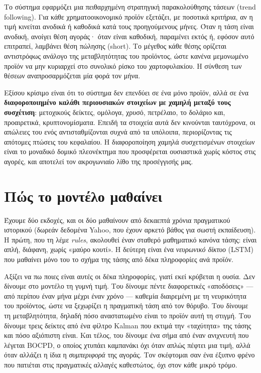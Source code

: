 \documentclass[11pt]{article}
\begin{document}
Το σύστημα εφαρμόζει μια πειθαρχημένη στρατηγική παρακολούθησης τάσεων (trend following). Για κάθε
χρηματοοικονομικό προϊόν εξετάζει, με ποσοτικά κριτήρια, αν η τιμή κινείται ανοδικά ή καθοδικά κατά τους
προηγούμενους μήνες. Όταν η τάση είναι ανοδική, ανοίγει θέση αγοράς· όταν είναι καθοδική, παραμένει εκτός
ή, εφόσον αυτό επιτραπεί, λαμβάνει θέση πώλησης (short). Το μέγεθος κάθε θέσης ορίζεται αντιστρόφως
ανάλογο της μεταβλητότητας του προϊόντος, ώστε κανένα μεμονωμένο προϊόν να μην κυριαρχεί στο συνολικό
ρίσκο του χαρτοφυλακίου. Η σύνθεση των θέσεων αναπροσαρμόζεται μία φορά τον μήνα.

Εξίσου κρίσιμο είναι ότι το σύστημα δεν επενδύει σε ένα μόνο προϊόν, αλλά σε ένα \textbf{διαφοροποιημένο
καλάθι περιουσιακών στοιχείων με χαμηλή μεταξύ τους συσχέτιση}: μετοχικούς δείκτες, ομόλογα, χρυσό,
πετρέλαιο, το δολάριο και, προαιρετικά, κρυπτονομίσματα. Επειδή τα στοιχεία αυτά δεν κινούνται
ταυτόχρονα, οι απώλειες του ενός αντισταθμίζονται συχνά από τα υπόλοιπα, περιορίζοντας τις απότομες
πτώσεις του κεφαλαίου. Η διαφοροποίηση χαμηλά συσχετισμένων στοιχείων είναι το μοναδικό δομικό
πλεονέκτημα που προσφέρεται ουσιαστικά χωρίς κόστος στις αγορές, και αποτελεί τον ακρογωνιαίο λίθο της
προσέγγισής μας.

\section{Πώς το μοντέλο μαθαίνει}

Έχουμε δύο εκδοχές, και οι δύο μαθαίνουν από δεκαεπτά χρόνια πραγματικού ιστορικού (δωρεάν δεδομένα
Yahoo, που έχουν αρκετό βάθος για σωστή εκπαίδευση). Η πρώτη, που τη λέμε \emph{rules}, ακολουθεί έναν
σταθερό μαθηματικό κανόνα τάσης: είναι απλή, διάφανη, χωρίς «μαύρο κουτί». Η δεύτερη είναι ένα
\emph{νευρωνικό δίκτυο} (LSTM) που μαθαίνει μόνο του το σχήμα της τάσης από δέκα πληροφορίες ανά προϊόν.

Αξίζει να πω ποιες είναι αυτές οι δέκα πληροφορίες, γιατί εκεί κρύβεται η ουσία. Δεν δίνουμε στο μοντέλο
τη γυμνή τιμή. Του δίνουμε πέντε διαφορετικές «αποδόσεις» --- από περίπου έναν μήνα μέχρι έναν χρόνο ---
καθεμία διαιρεμένη με τη νευρικότητα του προϊόντος, ώστε να ξεχωρίζει η πραγματική τάση από τον θόρυβο.
Του δίνουμε τη μεταβλητότητα, δηλαδή πόσο αναστατωμένο είναι το προϊόν αυτή τη στιγμή. Του δίνουμε τρεις
δείκτες από ένα φίλτρο Kalman που εκτιμά την «ταχύτητα» της τάσης και πόσο αξιόπιστη είναι. Και τέλος,
του δίνουμε ένα σήμα από έναν ανιχνευτή που λέγεται BOCPD, ο οποίος χτυπάει καμπανάκι όχι όταν απλώς
πέφτει μια τιμή, αλλά όταν αλλάζει η ίδια η \emph{συμπεριφορά} της αγοράς. Τον σκέφτομαι σαν ένα έξυπνο
φρένο που πατιέται στις πραγματικές αλλαγές καθεστώτος, όχι στον κάθε μικρό τρόμο.
\end{document}
